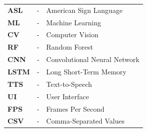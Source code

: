 
\begin{tabular}{lll}
	\textbf{ASL}&-& American Sign Language\\
	\textbf{ML}&-& Machine Learning\\
	\textbf{CV}&-& Computer Vision\\
	\textbf{RF}&-& Random Forest\\
	\textbf{CNN}&-& Convolutional Neural Network\\
	\textbf{LSTM}&-& Long Short-Term Memory\\
	\textbf{TTS}&-& Text-to-Speech\\
	\textbf{UI}&-& User Interface\\
	\textbf{FPS}&-& Frames Per Second\\
	\textbf{CSV}&-& Comma-Separated Values\\
\end{tabular}